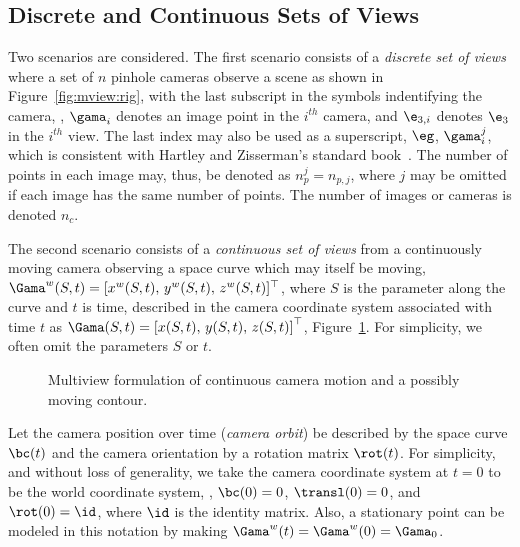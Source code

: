 
\subsection{Discrete and Continuous Sets of Views}
Two scenarios are considered. The first scenario consists of a
\emph{discrete set of views}
where a set of $n$ pinhole cameras observe a scene as shown in
Figure~\ref{fig:mview:rig}, with the last subscript in the symbols indentifying
the camera, \eg, $\gama_i$ denotes an image point in the $i^{th}$ camera,
and $\e_{3,i}$ denotes $\e_3$ in the $i^{th}$ view. The last index
may also be used as a superscript, $\eg$, $\gama_i^j$, which is 
consistent with Hartley and Zisserman's standard book~\cite{Hartley:Zisserman:multiple:view}.
The number of points in each image may, thus, be denoted as $n_p^j = n_{p,j}$,
where $j$ may be omitted if each image has the same number of points.
The number of images or cameras is denoted $n_c$.

The second scenario consists
of a \emph{continuous
set of views} from a continuously moving camera observing a space curve which may
itself be moving, $\Gama^w(S,t) = [x^w(S,t),\, y^w(S,t),\, z^w(S,t)]^\top$, 
where $S$ is the parameter along the curve and $t$ is time, 
described in the camera coordinate system associated with time $t$ as $\Gama(S,t) = \left[ x(S,t),\,
y(S,t),\, z(S,t) \right]^\top$, Figure~\ref{fig:mview:rig:continuous}. 
For simplicity, we often omit the parameters $S$ or $t$.
\begin{figure}
\centering
\caption{%
Multiview formulation of continuous camera motion and a possibly moving
contour.
}\label{fig:mview:rig:continuous}
\end{figure}
Let the camera position over time (\emph{camera orbit}) be described by the
space curve
$\bc(t)$ and the camera orientation
by a rotation matrix $\rot(t)$.
%
%
For simplicity, and without loss of
generality, we take the camera coordinate system at $t=0$ to be the world
coordinate system, \ie, 
$\bc(0) = 0$, $\transl(0) = 0$, and $\rot(0) = \id$,
where $\id$ is the identity matrix. Also, a stationary point can be modeled in
this notation by making $\Gama^w(t) = \Gama^w(0) = \Gama_0$.

